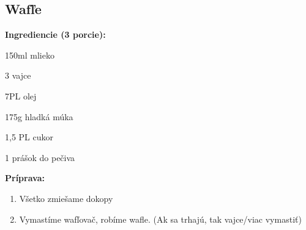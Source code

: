 \setcounter{step}{0}

\subsection{ Wafľe }

\begin{ingredient}
  
  \def\portions{  }
  \textbf{ {\normalsize Ingrediencie (3 porcie):} }

  \begin{main}
      \item 150ml mlieko
      \item 3 vajce
      \item 7PL olej
      \item 175g hladká múka
      \item 1,5 PL cukor
      \item 1 prášok do pečiva
  \end{main}
  
\end{ingredient}
\begin{recipe}
\textbf{ {\normalsize Príprava:} }
\begin{enumerate}

  \item{Všetko zmiešame dokopy}
  \item{Vymastíme wafľovač, robíme wafle. (Ak sa trhajú, tak vajce/viac vymastiť)}

\end{enumerate}
\end{recipe}

\begin{notes}
  
\end{notes}	
\clearpage
